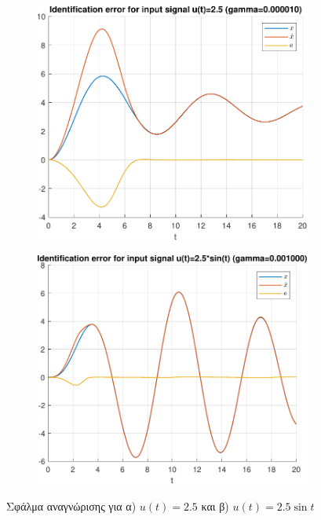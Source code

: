 \documentclass[a4paper,12pt]{article}
\begin{document}
\begin{figure}[h!]
    \centering
    \begin{subfigure}{0.45\textwidth}
        \centering
        \includegraphics[width=\linewidth]{plot/identification_error_1.pdf}
        \caption{}
        \label{fig:identification_error_1}
    \end{subfigure}
    \hfill
    \begin{subfigure}{0.45\textwidth}
        \centering
        \includegraphics[width=\linewidth]{plot/identification_error_2.pdf}
        \caption{}
        \label{fig:identification_error_2}
    \end{subfigure}
    \caption{Σφάλμα αναγνώρισης για α) $u(t) = 2.5$ και β) $u(t) = 2.5 \sin t$}
    \label{fig:identification_error}
\end{figure}
\end{document}
